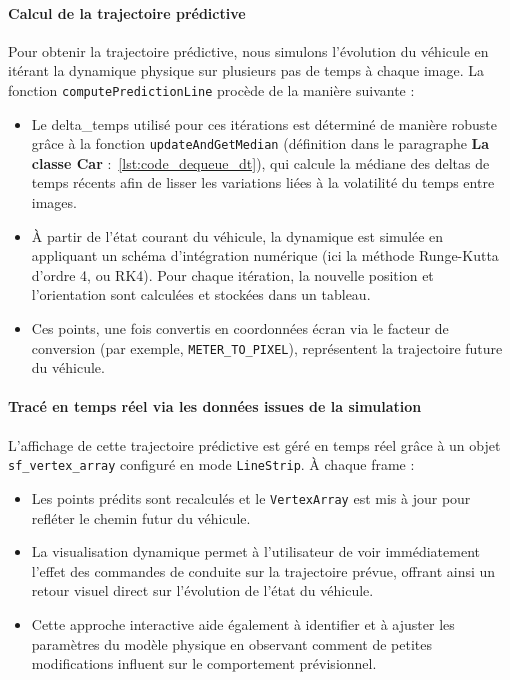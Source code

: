 \paragraph{Calcul de la trajectoire prédictive}
Pour obtenir la trajectoire prédictive, nous simulons l'évolution du véhicule en itérant la dynamique physique sur plusieurs pas de temps à chaque image.
La fonction \texttt{computePredictionLine} procède de la manière suivante :
\begin{itemize}
    \item Le \gls{delta_temps} utilisé pour ces itérations est déterminé de manière robuste grâce à la fonction \texttt{updateAndGetMedian} (définition dans le paragraphe \textbf{La classe Car} :~\ref{lst:code_dequeue_dt}), qui calcule la médiane des deltas de temps récents afin de lisser les variations liées à la volatilité du temps entre images.
    \item À partir de l'état courant du véhicule, la dynamique est simulée en appliquant un schéma d'intégration numérique (ici la méthode Runge-Kutta d'ordre 4, ou RK4).
    Pour chaque itération, la nouvelle position et l'orientation sont calculées et stockées dans un tableau.
    \item Ces points, une fois convertis en coordonnées écran via le facteur de conversion (par exemple, \texttt{METER\_TO\_PIXEL}), représentent la trajectoire future du véhicule.
\end{itemize}

\paragraph{Tracé en temps réel via les données issues de la simulation}
L'affichage de cette trajectoire prédictive est géré en temps réel grâce à un objet \texttt{\gls{sf_vertex_array}}\cite{sfml_sf_vertexarray} configuré en mode \texttt{LineStrip}.
À chaque frame :
\begin{itemize}
    \item Les points prédits sont recalculés et le \texttt{VertexArray} est mis à jour pour refléter le chemin futur du véhicule.
    \item La visualisation dynamique permet à l'utilisateur de voir immédiatement l'effet des commandes de conduite sur la trajectoire prévue, offrant ainsi un retour visuel direct sur l'évolution de l'état du véhicule.
    \item Cette approche interactive aide également à identifier et à ajuster les paramètres du modèle physique en observant comment de petites modifications influent sur le comportement prévisionnel.
\end{itemize}

